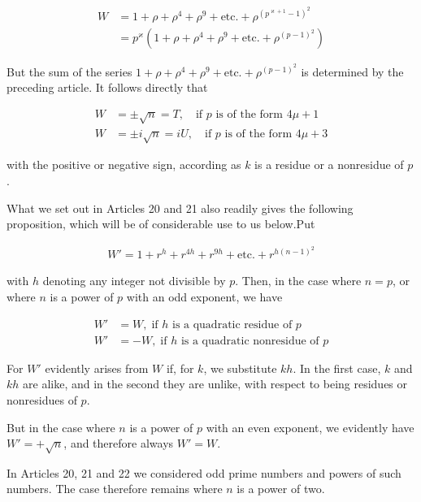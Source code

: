 \[
\begin{aligned}
W&=1+\rho+\rho^4+\rho^9+\text{etc.}+\rho^{(p^{\varkappa+1}-1)^2}\\&=p^\varkappa(1+\rho+\rho^4+\rho^9+\text{etc.}+\rho^{(p-1)^2})
\end{aligned}
\]

But the sum of the series $1+\rho+\rho^4+\rho^9+\text{etc.}+\rho^{(p-1)^2}$ is determined by the preceding article. It follows directly that

\[
\begin{aligned}
W&=\pm\surd n=T,\quad\text{if }p\text{ is of the form }4\mu+1\\
W&=\pm i\surd n=iU,\quad\text{if }p\text{ is of the form }4\mu+3
\end{aligned}
\]

with the positive or negative sign, according as $k$ is a residue or a nonresidue of $p$.


What we set out in Articles 20 and 21 also readily gives the following proposition, which will be of considerable use to us below.\quad Put

\[
\begin{aligned}
W'=1+r^h+r^{4h}+r^{9h}+\text{etc.}+r^{h(n-1)^2}
\end{aligned}
\]


with $h$ denoting any integer not divisible by $p$. Then, in the case where $n=p$, or where $n$ is a power of $p$ with an odd exponent, we have

\[
\begin{aligned}
W'&=W,\;\text{if }h\text{ is a quadratic residue of }p\\
W'&=-W,\;\text{if }h\text{ is a quadratic nonresidue of }p
\end{aligned}
\]

For $W'$ evidently arises from $W$ if, for $k$, we substitute $kh$. In the first case, $k$ and $kh$ are alike, and in the second they are unlike, with respect to being residues or nonresidues of $p$.

But in the case where $n$ is a power of $p$ with an even exponent, we evidently have $W'=+\surd n$, and therefore always $W'=W$.


In Articles 20, 21 and 22 we considered odd prime numbers and powers of such numbers. The case therefore remains where $n$ is a power of two.


